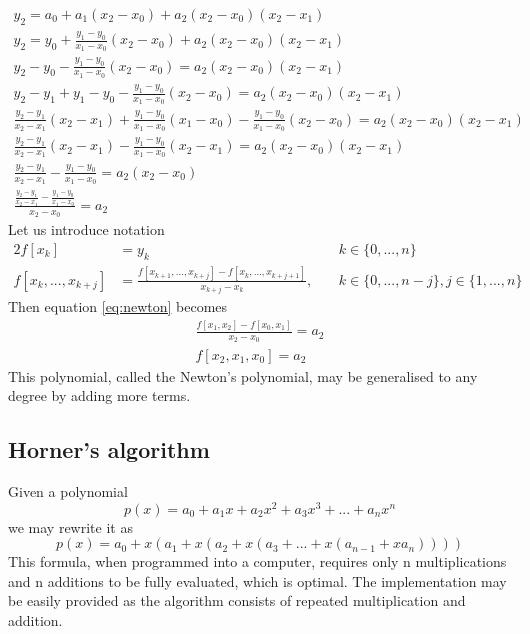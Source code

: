 \documentclass[12pt, a4paper]{article}
\begin{document}
\begin{gather}
  y_2 = a_0 + a_1(x_2 - x_0) + a_2(x_2 - x_0)(x_2 - x_1) \nonumber \\
  y_2 = y_0 + \frac{y_1 - y_0}{x_1 - x_0}(x_2 - x_0) + a_2(x_2 - x_0)(x_2 - x_1) \nonumber \\
  y_2 - y_0 - \frac{y_1 - y_0}{x_1 - x_0}(x_2 - x_0) = a_2(x_2 - x_0)(x_2 - x_1) \nonumber \\
  y_2 - y_1 + y_1 - y_0 - \frac{y_1 - y_0}{x_1 - x_0}(x_2 - x_0) = a_2(x_2 - x_0)(x_2 - x_1) \nonumber \\
  \frac{y_2 - y_1}{x_2 - x_1}(x_2 - x_1) + \frac{y_1 - y_0}{x_1 - x_0}(x_1 - x_0) - \frac{y_1 - y_0}{x_1 - x_0}(x_2 - x_0) = a_2(x_2 - x_0)(x_2 - x_1) \nonumber \\
  \frac{y_2 - y_1}{x_2 - x_1}(x_2 - x_1) - \frac{y_1 - y_0}{x_1 - x_0}(x_2 - x_1) = a_2(x_2 - x_0)(x_2 - x_1) \nonumber \\
  \frac{y_2 - y_1}{x_2 - x_1} - \frac{y_1 - y_0}{x_1 - x_0} = a_2(x_2 - x_0) \nonumber \\
  \frac{\frac{y_2 - y_1}{x_2 - x_1} - \frac{y_1 - y_0}{x_1 - x_0}}{x_2 - x_0} = a_2 \label{eq:newton}
\end{gather}
Let us introduce notation
\begin{alignat*}{2}
  f[x_k] &= y_k \quad && k \in \{0, ..., n\} \\
  f[x_k, ..., x_{k+j}] &= \frac{f[x_{k+1}, ..., x_{k+j}] - f[x_k, ..., x_{k+j+1}]}{x_{k+j} - x_k}, \ && k \in \{0, ..., n - j\}, j \in \{1, ..., n\}
\end{alignat*}
Then equation \ref{eq:newton} becomes
\begin{gather*}
  \frac{f[x_1, x_2] - f[x_0, x_1]}{x_2 - x_0} = a_2 \\
  f[x_2, x_1, x_0] = a_2
\end{gather*}
This polynomial, called the Newton's polynomial, may be generalised to any
degree by adding more terms.

\subsection{Horner's algorithm}
Given a polynomial
$$
p(x) = a_0 + a_1x + a_2x^2 + a_3x^3 + ... + a_nx^n
$$
we may rewrite it as
$$
p(x) = a_0 + x(a_1 + x(a_2 + x(a_3 + ... + x(a_{n-1} + xa_n))))
$$
This formula, when programmed into a computer, requires only n multiplications
and n additions to be fully evaluated, which is optimal. The implementation may
be easily provided as the algorithm consists of repeated multiplication and
addition.
\end{document}
